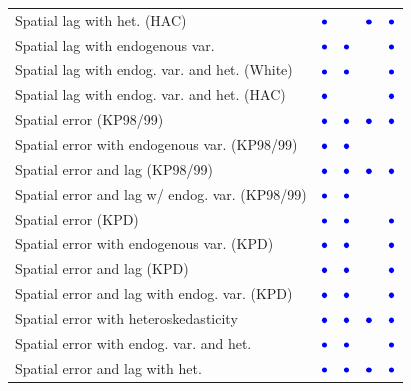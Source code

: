 \documentclass{article}
\begin{document}
\begin{table}[htpb]
\begin{small}
\begin{tabular}{l|cccc}
Spatial lag with het. (HAC)&{\LARGE$\textcolor{blue}\bullet$}&&{\LARGE$\textcolor{blue}\bullet$}&{\LARGE$\textcolor{blue}\bullet$}\\
Spatial lag with endogenous var.&{\LARGE$\textcolor{blue}\bullet$}&{\LARGE$\textcolor{blue}\bullet$}&&{\LARGE$\textcolor{blue}\bullet$}\\
Spatial lag with endog. var. and het. (White)&{\LARGE$\textcolor{blue}\bullet$}&{\LARGE$\textcolor{blue}\bullet$}&&{\LARGE$\textcolor{blue}\bullet$}\\
Spatial lag with endog. var. and het. (HAC) &{\LARGE$\textcolor{blue}\bullet$}&&&{\LARGE$\textcolor{blue}\bullet$}\\
Spatial error (KP98/99)&{\LARGE$\textcolor{blue}\bullet$}&{\LARGE$\textcolor{blue}\bullet$}&{\LARGE$\textcolor{blue}\bullet$}&{\LARGE$\textcolor{blue}\bullet$}\\
Spatial error with endogenous var. (KP98/99)&{\LARGE$\textcolor{blue}\bullet$}&{\LARGE$\textcolor{blue}\bullet$}&&\\
Spatial error and lag (KP98/99)&{\LARGE$\textcolor{blue}\bullet$}&{\LARGE$\textcolor{blue}\bullet$}&{\LARGE$\textcolor{blue}\bullet$}&{\LARGE$\textcolor{blue}\bullet$}\\
Spatial error and lag w/ endog. var. (KP98/99)&{\LARGE$\textcolor{blue}\bullet$}&{\LARGE$\textcolor{blue}\bullet$}&&\\
Spatial error (KPD)&{\LARGE$\textcolor{blue}\bullet$}&{\LARGE$\textcolor{blue}\bullet$}&&{\LARGE$\textcolor{blue}\bullet$}\\
Spatial error with endogenous var. (KPD)&{\LARGE$\textcolor{blue}\bullet$}&{\LARGE$\textcolor{blue}\bullet$}&&{\LARGE$\textcolor{blue}\bullet$}\\
Spatial error and lag (KPD)&{\LARGE$\textcolor{blue}\bullet$}&{\LARGE$\textcolor{blue}\bullet$}&&{\LARGE$\textcolor{blue}\bullet$}\\
Spatial error and lag with endog. var. (KPD)&{\LARGE$\textcolor{blue}\bullet$}&{\LARGE$\textcolor{blue}\bullet$}&&{\LARGE$\textcolor{blue}\bullet$}\\
Spatial error with heteroskedasticity&{\LARGE$\textcolor{blue}\bullet$}&{\LARGE$\textcolor{blue}\bullet$}&{\LARGE$\textcolor{blue}\bullet$}&{\LARGE$\textcolor{blue}\bullet$}\\
Spatial error with endog. var. and het.&{\LARGE$\textcolor{blue}\bullet$}&{\LARGE$\textcolor{blue}\bullet$}&&{\LARGE$\textcolor{blue}\bullet$}\\
Spatial error and lag with het.&{\LARGE$\textcolor{blue}\bullet$}&{\LARGE$\textcolor{blue}\bullet$}&{\LARGE$\textcolor{blue}\bullet$}&{\LARGE$\textcolor{blue}\bullet$}\\

\end{tabular}
\end{small}
\end{table}
\end{document}
